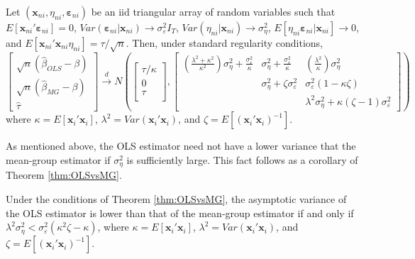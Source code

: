 \begin{thm}
\label{thm:OLSvsMG}
Let $\left( \mathbf{x}_{ni},\eta_{ni}, \boldsymbol{\varepsilon}_{ni} \right)$ be an iid triangular array of random variables such that $E[\mathbf{x}_{ni}'\boldsymbol{\varepsilon}_{ni}] =0$, $Var(\boldsymbol{\varepsilon}_{ni}|\mathbf{x}_{ni}) \rightarrow \sigma_{\varepsilon}^2 I_T$, $Var(\eta_{ni}|\mathbf{x}_{ni}) \rightarrow \sigma_{\eta}^2$, $E[\eta_{ni} \boldsymbol{\varepsilon}_{ni}|\mathbf{x}_{ni}] \rightarrow 0$, and $E[\mathbf{x}_{ni}'\mathbf{x}_{ni}\eta_{ni}] = \tau/\sqrt{n}$.
Then, under standard regularity conditions, 
\[
  \left[\begin{array}{c}
\sqrt{n} (\widehat{\beta}_{OLS} - \beta)\\
\sqrt{n} (\widehat{\beta}_{MG} - \beta)\\
\widehat{\tau}
\end{array}\right] \overset{d}{\rightarrow} N \left( 
\left[\begin{array}{c}
\tau/\kappa \\
0  \\
\tau\\
\end{array}\right],  
\left[
\begin{array}{ccc}
  \displaystyle\left(\frac{\lambda^2 + \kappa^2}{\kappa^2}\right)\sigma_\eta^2 + \frac{\sigma_\varepsilon^2}{\kappa} & \displaystyle \sigma_\eta^2 + \frac{\sigma_\varepsilon^2}{\kappa} &\displaystyle\left(\frac{\lambda^2}{\kappa}\right)\sigma_\eta^2  \\
  & \sigma_{\eta}^2 + \zeta \sigma_\varepsilon^2 & \sigma_{\varepsilon}^2 (1 - \kappa\zeta) \\
   &  & \lambda^2 \sigma_\eta^2 + \kappa(\zeta - 1) \sigma_\varepsilon^2 
\end{array}
\right]\right)
\]
where $\kappa = E[\mathbf{x}_i' \mathbf{x}_i]$, $\lambda^2 = Var\left( \mathbf{x}_i'\mathbf{x}_i \right)$, and $\zeta = E\left[ \left( \mathbf{x}_i' \mathbf{x}_i \right)^{-1} \right]$.  
\end{thm}

As mentioned above, the OLS estimator need not have a lower variance that the mean-group estimator if $\sigma_{\eta}^2$ is sufficiently large.
This fact follows as a corollary of Theorem \ref{thm:OLSvsMG}.

\begin{cor}
  Under the conditions of Theorem \ref{thm:OLSvsMG}, the asymptotic variance of the OLS estimator is lower than that of the mean-group estimator if and only if $\lambda^2\sigma_\eta^2 < \sigma_\varepsilon^2(\kappa^2\zeta - \kappa)$, 
where $\kappa = E[\mathbf{x}_i' \mathbf{x}_i]$, $\lambda^2 = Var\left( \mathbf{x}_i'\mathbf{x}_i \right)$, and $\zeta = E\left[ \left( \mathbf{x}_i' \mathbf{x}_i \right)^{-1} \right]$.  
\end{cor}

